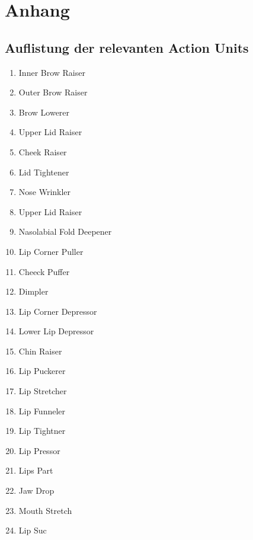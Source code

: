 \chapter{Anhang}

\section{Auflistung der relevanten Action Units}\label{Anhang.AUs}
\begin{multicols}{2}
\begin{enumerate}
    \item{Inner Brow Raiser}
    \item{Outer Brow Raiser}
    \item{Brow Lowerer}
    \item{Upper Lid Raiser}
    \item{Cheek Raiser}
    \item{Lid Tightener}
    \item{Nose Wrinkler}
    \item{Upper Lid Raiser}
    \item{Nasolabial Fold Deepener}
    \item{Lip Corner Puller}
    \item{Cheeck Puffer}
    \item{Dimpler}
    \item{Lip Corner Depressor}
    \item{Lower Lip Depressor}
    \item{Chin Raiser}
    \item{Lip Puckerer}
    \item{Lip Stretcher}
    \item{Lip Funneler}
    \item{Lip Tightner}
    \item{Lip Pressor}
    \item{Lips Part}
    \item{Jaw Drop}
    \item{Mouth Stretch}
    \item{Lip Suc}
\end{enumerate}
\end{multicols}
